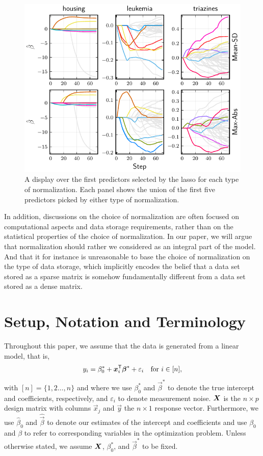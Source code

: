 \begin{figure}[bpt]
  \centering
  \includegraphics[]{plots/realdata_paths.pdf}
  \caption{%
    A display over the first predictors selected by the lasso for each type of normalization. Each panel shows the union of the first five predictors picked by either type of normalization.
  }
  \label{fig:realdata-paths}
\end{figure}

In addition, discussions on the choice of normalization are often focused on computational aspects and data storage requirements, rather than on the statistical properties of the choice of normalization. In our paper, we will argue that normalization should rather we considered as an integral part of the model. And that it for instance is unreasonable to base the choice of normalization on the type of data storage, which implicitly encodes the belief that a data set stored as a sparse matrix is somehow fundamentally different from a data set stored as a dense matrix.

\section{Setup, Notation and Terminology}

Throughout this paper, we assume that the data is generated from a linear model, that is,
\[
  y_i = \beta_0^* + \boldsymbol x_i^{\mathsf{T}} \boldsymbol\beta^* + \varepsilon_i \quad\text{for } i \in [n],
\]
with \([n] = \{1,2\dots,n\}\) and
where we use \(\beta_0^*\) and \(\vec\beta^*\) to denote the true intercept and coefficients, respectively, and \(\varepsilon_i\) to denote measurement noise. \(\boldsymbol X\) is the \(n \times p\) design matrix with columns \(\vec x_j\) and \(\vec y\) the \(n \times 1\) response vector.
Furthermore, we use \(\hat\beta_0\) and \(\hat{\vec{\beta}}\) to denote our estimates of the intercept and coefficients and use \(\beta_0\) and \(\beta\) to refer to corresponding variables in the optimization problem.
Unless otherwise stated, we assume \(\boldsymbol{X}\), \(\beta_0^*\), and \(\vec{\beta}^*\) to be fixed.

